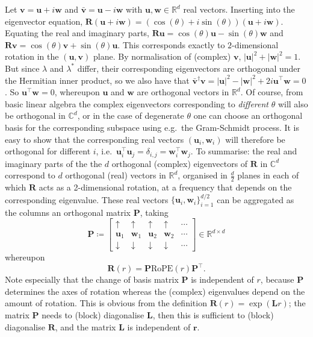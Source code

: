 Let $\mathbf{v} = \mathbf{u} + i \mathbf{w}$ and $\bar{\mathbf{v}} = \mathbf{u} - i \mathbf{w}$ with $\mathbf{u}, \mathbf{w} \in \mathbb{R}^d$ real vectors. 
Inserting into the eigenvector equation, $\mathbf{R}(\mathbf{u} + i \mathbf{w}) = (\cos(\theta) + i \sin(\theta))(\mathbf{u} + i \mathbf{w})$.
Equating the real and imaginary parts, $\mathbf{R}\mathbf{u} = \cos(\theta) \mathbf{u} - \sin(\theta) \mathbf{w}$ and 
$\mathbf{R}\mathbf{v} = \cos(\theta) \mathbf{v} + \sin(\theta) \mathbf{u}$.
This corresponds exactly to $2$-dimensional rotation in the $(\mathbf{u},\mathbf{v})$ plane.
By normalisation of (complex) $\mathbf{v}$, $|\mathbf{u}|^2 + |\mathbf{w}|^2 = 1$.
But since $\lambda$ and $\lambda^*$ differ, their corresponding eigenvectors are orthogonal under the Hermitian inner product, so we also have that $\bar{\mathbf{v}}^\dag \mathbf{v} = |\mathbf{u}|^2 - |\mathbf{w}|^2 + 2i \mathbf{u}^\top \mathbf{w} = 0$.
So $\mathbf{u}^\top \mathbf{w}=0$, whereupon $\mathbf{u}$ and $\mathbf{w}$ are orthogonal vectors in $\mathbb{R}^d$.
Of course, from basic linear algebra the complex eigenvectors corresponding to \emph{different} $\theta$ will also be orthogonal in $\mathbb{C}^d$, or in the case of degenerate $\theta$ one can choose an orthogonal basis for the corresponding subspace using e.g.~the Gram-Schmidt process.
It is easy to show that the corresponding real vectors $(\mathbf{u}_i, \mathbf{w}_i)$ will therefore be orthogonal for different $i$, i.e.~$\mathbf{u}_i^\top \mathbf{u}_j =\delta_{i,j} = \mathbf{w}_i^\top \mathbf{w}_j$.
To summarise: the real and imaginary parts of the the $d$ orthogonal (complex) eigenvectors of $\mathbf{R}$ in $\mathbb{C}^d$ correspond to $d$ orthogonal (real) vectors in $\mathbb{R}^d$, organised in $\frac{d}{2}$ planes in each of which $\mathbf{R}$ acts as a 2-dimensional rotation, at a frequency that depends on the corresponding eigenvalue. 
These real vectors $\{\mathbf{u}_i, \mathbf{w}_i \}_{i=1}^{d/2}$ can be aggregated as the columns an orthogonal matrix $\mathbf{P}$, taking 
\begin{equation}
    \mathbf{P} \coloneqq 
\begin{bmatrix} 
\uparrow & \uparrow & \uparrow & \uparrow & \cdots  \\
\mathbf{u}_1 & \mathbf{w}_1 & \mathbf{u}_2 & \mathbf{w}_2 & \cdots\\
\downarrow & \downarrow & \downarrow & \downarrow & \cdots 
\end{bmatrix}
\in \mathbb{R}^{d \times d}
\end{equation}
whereupon 
\begin{equation}
    \mathbf{R}(r) = \mathbf{P} \textrm{RoPE}(r) \mathbf{P}^\top.
\end{equation}
Note especially that the change of basis matrix $\mathbf{P}$ is independent of $r$, because $\mathbf{P}$ determines the axes of rotation whereas the (complex) eigenvalues depend on the amount of rotation. 
This is obvious from the definition $\mathbf{R}(r)=\exp(\mathbf{L}r)$; the matrix $\mathbf{P}$ needs to (block) diagonalise $\mathbf{L}$, then this is sufficient to (block) diagonalise $\mathbf{R}$, and the matrix $\mathbf{L}$ is independent of $\mathbf{r}$.

